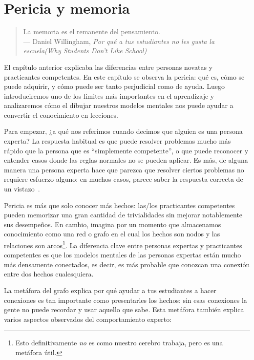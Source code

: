 \chapter{Pericia y memoria}\label{s:memory}

\begin{quote}

  La memoria es el remanente del pensamiento. \\
  --- Daniel Willingham, \emph{Por qué a tus estudiantes no les gusta la escuela(Why Students Don't Like School)}

\end{quote}

El capítulo anterior explicaba las diferencias entre personas novatas y practicantes competentes.
En este capítulo se observa la pericia:
qué es,
cómo se puede adquirir,
y cómo puede ser tanto perjudicial como de ayuda.
Luego introduciremos uno de los límites más importantes en el aprendizaje
y analizaremos cómo el dibujar nuestros modelos mentales nos puede ayudar a convertir el conocimiento en lecciones.

Para empezar,
¿a qué nos referimos cuando decimos que alguien es una persona experta?
La respuesta habitual es que puede resolver problemas mucho más rápido que la persona que es “simplemente competente'',
o que puede reconocer y entender casos donde las reglas normales no se pueden aplicar.
Es más, de alguna manera una persona experta hace que parezca que resolver ciertos problemas no requiere esfuerzo alguno:
en muchos casos,
parece saber la respuesta correcta de un vistazo~\cite{Parn2017}.

Pericia es más que solo conocer más hechos:
las/los practicantes competentes pueden memorizar una gran cantidad de trivialidades sin  mejorar notablemente sus desempeños.
En cambio,
imagina por un momento que almacenamos conocimiento como una red o grafo en el cual los hechos son nodos
y las relaciones son arcos\footnote{Esto definitivamente \emph{no} es como nuestro cerebro trabaja, pero es una metáfora útil.}.
La diferencia clave entre personas expertas y practicantes competentes es que
los modelos mentales de las personas expertas están mucho más densamente conectados, 
es decir, es más probable que conozcan una conexión entre dos hechos cualesquiera.

La metáfora del grafo explica por qué ayudar a tus estudiantes a hacer conexiones es tan importante como presentarles los hechos:
sin esas conexiones
la gente no puede recordar y usar aquello que sabe.
Esta metáfora también explica varios aspectos observados del comportamiento experto:


